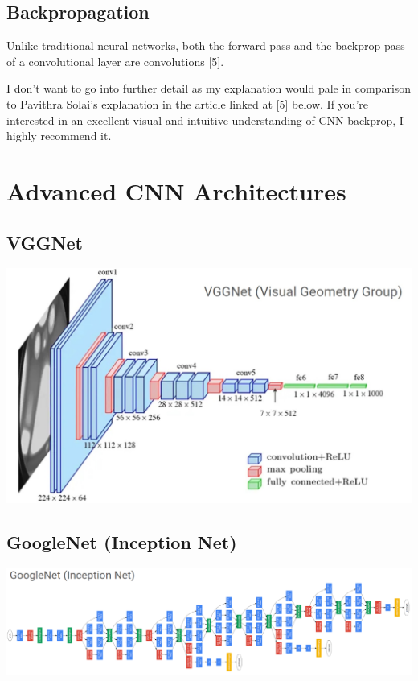 \documentclass{article}
\begin{document}
    \subsection{Backpropagation}
        Unlike traditional neural networks, both the forward pass and the backprop pass of a convolutional layer are convolutions [5].

        I don't want to go into further detail as my explanation would pale in comparison to Pavithra Solai's explanation in the article linked at [5] below. If you're interested in an excellent visual and intuitive understanding of CNN backprop, I highly recommend it.
        
\section{Advanced CNN Architectures}
    \subsection{VGGNet}
        \begin{center}
            \includegraphics[scale=0.4]{images/VGG.jpg}
        \end{center}

    \subsection{GoogleNet (Inception Net)}
        \begin{center}
            \includegraphics[scale=0.35]{images/GoogleNet.png}
        \end{center}
\end{document}
